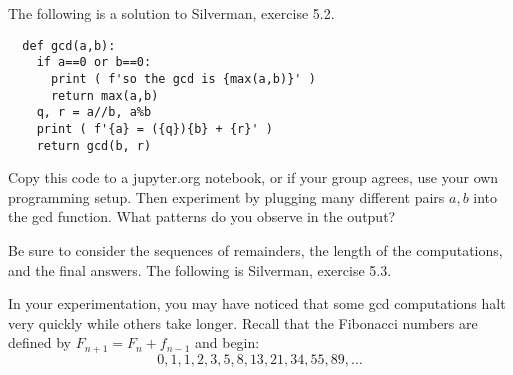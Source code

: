 \documentclass[12pt]{exam}
\begin{document}
\begin{questions}
  \question The following is a solution to Silverman, exercise 5.2.
  \begin{lstlisting}
  def gcd(a,b):
    if a==0 or b==0:
      print ( f'so the gcd is {max(a,b)}' )
      return max(a,b)
    q, r = a//b, a%b
    print ( f'{a} = ({q}){b} + {r}' )
    return gcd(b, r)
  \end{lstlisting}
  Copy this code to a jupyter.org notebook, or if your group agrees, use your own programming setup. Then experiment by plugging many different pairs $a,b$ into the gcd function. What patterns do you observe in the output?
  
  Be sure to consider the sequences of remainders, the length of the computations, and the final answers.
  \newpage
  \question The following is Silverman, exercise 5.3.
  \newpage
  \question In your experimentation, you may have noticed that some gcd computations halt very quickly while others take longer. Recall that the Fibonacci numbers are defined by $F_{n+1}=F_n+f_{n-1}$ and begin:
  \[0,1,1,2,3,5,8,13,21,34,55,89,\ldots
  \]
\end{questions}
\end{document}
